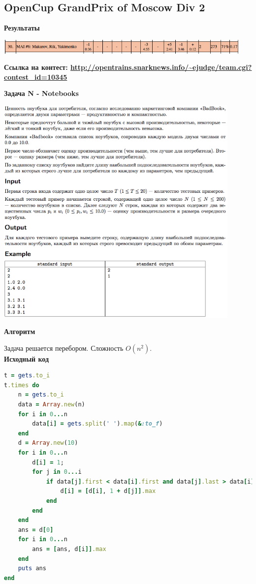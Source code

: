 \documentclass[a4paper,12pt]{article}
\begin{document}
\subsection{OpenCup GrandPrix of Moscow Div 2}

\textbf{{\large Результаты}} \\
\begin{center}
\includegraphics[width=0.95\textwidth]{OC_Moscow/result.png}\\ [1cm]
\end{center}

\textbf{{\large Ссылка на контест: \url{http://opentrains.snarknews.info/~ejudge/team.cgi?contest_id=10345}}}

\newpage
\textbf{{\large Задача N - Notebooks}}

\begin{center}
\includegraphics[width=0.9\textwidth]{OC_Moscow/N.png}\\ [1cm]
\end{center}

\textbf{{\large Алгоритм}}

Задача решается перебором. Сложность $O(n^2)$. \\
\newpage
\textbf{{\large Исходный код}} \\
\begin{lstlisting}[language=Ruby]
t = gets.to_i
t.times do
    n = gets.to_i
    data = Array.new(n)
    for i in 0...n
        data[i] = gets.split(' ').map(&:to_f)
    end
    d = Array.new(10)
    for i in 0...n
        d[i] = 1;
        for j in 0...i
            if data[j].first < data[i].first and data[j].last > data[i].last
                d[i] = [d[i], 1 + d[j]].max
            end
        end
    end
    ans = d[0]
    for i in 0...n
        ans = [ans, d[i]].max
    end
    puts ans
end
\end{lstlisting}
\end{document}
